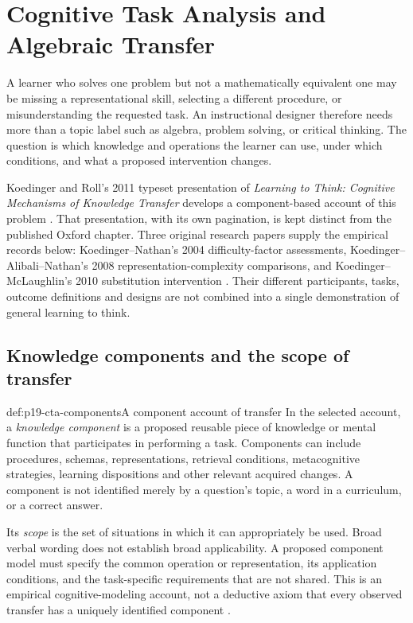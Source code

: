 \chapter{Cognitive Task Analysis and Algebraic Transfer}
\label{sec:p19-task-analysis-algebra}

A learner who solves one problem but not a mathematically equivalent
one may be missing a representational skill, selecting a different
procedure, or misunderstanding the requested task. An instructional
designer therefore needs more than a topic label such as algebra,
problem solving, or critical thinking. The question is which knowledge
and operations the learner can use, under which conditions, and what
a proposed intervention changes.

Koedinger and Roll's 2011 typeset presentation of \emph{Learning to Think:
Cognitive Mechanisms of Knowledge Transfer} develops a component-based
account of this problem \cite[galley pp.~699--716]{KoedingerRoll2011TransferTypeset}.
That presentation, with its own pagination, is kept distinct from the
published Oxford chapter. Three original research papers supply the
empirical records below: Koedinger--Nathan's 2004 difficulty-factor
assessments, Koedinger--Alibali--Nathan's 2008 representation-complexity
comparisons, and Koedinger--McLaughlin's 2010 substitution intervention
\cite{KoedingerNathan2004StoryCTA,KoedingerAlibaliNathan2008TradeoffsCTA,
KoedingerMcLaughlin2010LanguageTransfer}.
Their different participants, tasks, outcome definitions and designs are
not combined into a single demonstration of general learning to think.

\section{Knowledge components and the scope of transfer}
\label{sec:p19-cta-components}

\begin{hbdefinition}{def:p19-cta-components}{A component account of transfer}
In the selected account, a \emph{knowledge component} is a proposed
reusable piece of knowledge or mental function that participates in
performing a task. Components can include procedures, schemas,
representations, retrieval conditions, metacognitive strategies,
learning dispositions and other relevant acquired changes. A component
is not identified merely by a question's topic, a word in a curriculum,
or a correct answer.

Its \emph{scope} is the set of situations in which it can appropriately
be used. Broad verbal wording does not establish broad applicability.
A proposed component model must specify the common operation or
representation, its application conditions, and the task-specific
requirements that are not shared.
This is an empirical cognitive-modeling account, not a deductive axiom
that every observed transfer has a uniquely identified component
\cite[galley pp.~700--704,710--713]{KoedingerRoll2011TransferTypeset}.
\end{hbdefinition}

